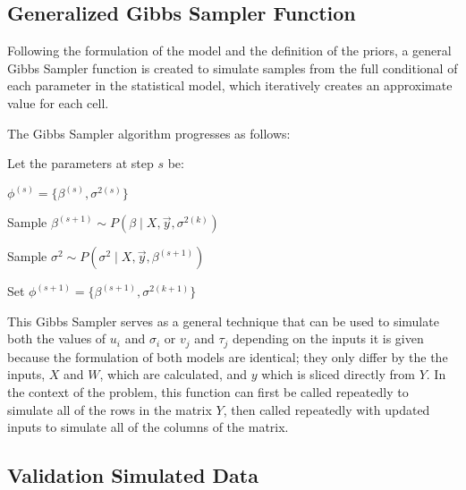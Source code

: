 \documentclass[12pt,twoside]{dukestatscithesis}
\theoremstyle{definition}
\theoremstyle{definition}
\theoremstyle{definition}
\theoremstyle{remark}
\begin{document}
\subsection{Generalized Gibbs Sampler
Function}\label{generalized-gibbs-sampler-function}

Following the formulation of the model and the definition of the priors,
a general Gibbs Sampler function is created to simulate samples from the
full conditional of each parameter in the statistical model, which
iteratively creates an approximate value for each cell.

The Gibbs Sampler algorithm progresses as follows:

Let the parameters at step \(s\) be:

\(\phi^{(s)} = \{\beta^{(s)}, \sigma^{2(s)}\}\)

Sample \(\beta^{(s+1)} \sim P(\beta \mid X, \vec{y}, \sigma^{2(k)})\)

Sample \(\sigma^2 \sim P(\sigma^2 \mid X, \vec{y}, \beta^{(s+1)})\)

Set \(\phi^{(s+1)} = \{\beta^{(s+1)}, \sigma^{2(k+1)}\}\)

This Gibbs Sampler serves as a general technique that can be used to
simulate both the values of \(u_i\) and \(\sigma_i\) or \(v_j\) and
\(\tau_j\) depending on the inputs it is given because the formulation
of both models are identical; they only differ by the the inputs, \(X\)
and \(W\), which are calculated, and \(y\) which is sliced directly from
\(Y\). In the context of the problem, this function can first be called
repeatedly to simulate all of the rows in the matrix \(Y\), then called
repeatedly with updated inputs to simulate all of the columns of the
matrix.

\subsection{Validation Simulated Data}\label{validation-simulated-data}
\end{document}
